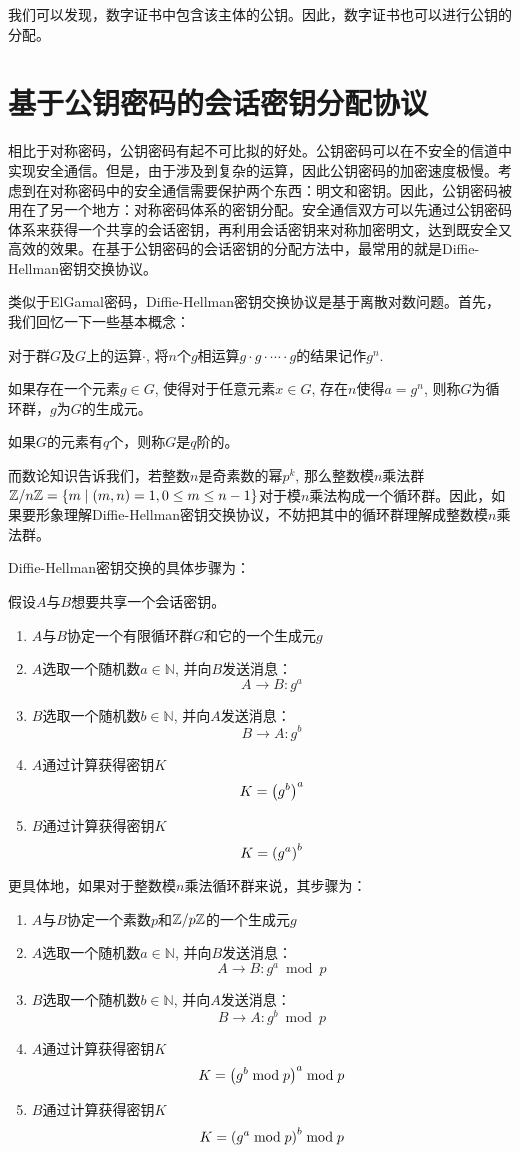 我们可以发现，数字证书中包含该主体的公钥。因此，数字证书也可以进行公钥的分配。
\section{基于公钥密码的会话密钥分配协议}
相比于对称密码，公钥密码有起不可比拟的好处。公钥密码可以在不安全的信道中实现安全通信。但是，由于涉及到复杂的运算，因此公钥密码的加密速度极慢。考虑到在对称密码中的安全通信需要保护两个东西：明文和密钥。因此，公钥密码被用在了另一个地方：对称密码体系的密钥分配。安全通信双方可以先通过公钥密码体系来获得一个共享的会话密钥，再利用会话密钥来对称加密明文，达到既安全又高效的效果。在基于公钥密码的会话密钥的分配方法中，最常用的就是Diffie-Hellman密钥交换协议。\par
类似于ElGamal密码，Diffie-Hellman密钥交换协议是基于离散对数问题。首先，我们回忆一下一些基本概念：\par
对于群$G$及$G$上的运算$\cdot$, 将$n$个$g$相运算$g\cdot g\cdot \cdots \cdot g$的结果记作$g^n$.\par
如果存在一个元素$g\in G$, 使得对于任意元素$x\in G$, 存在$n$使得$a=g^n$, 则称$G$为循环群，$g$为$G$的生成元。\par
如果$G$的元素有$q$个，则称$G$是$q$阶的。\par
而数论知识告诉我们，若整数$n$是奇素数的幂$p^k$, 那么整数模$n$乘法群$\mathbb{Z}/n\mathbb{Z}=\{m\mid \left( {m, n}\right)=1, 0\leq m\leq n-1\}$对于模$n$乘法构成一个循环群。因此，如果要形象理解Diffie-Hellman密钥交换协议，不妨把其中的循环群理解成整数模$n$乘法群。\par
Diffie-Hellman密钥交换的具体步骤为：\par
假设$A$与$B$想要共享一个会话密钥。
\begin{enumerate}
	\item $A$与$B$协定一个有限循环群$G$和它的一个生成元$g$
	\item $A$选取一个随机数$a\in\mathbb{N}$, 并向$B$发送消息：
	\[A\to B: g^a\]
	\item $B$选取一个随机数$b\in\mathbb{N}$, 并向$A$发送消息：
	\[B\to A: g^b\]
	\item $A$通过计算获得密钥$K$
	\[K=\left( {g^b}\right)^a\]
	\item $B$通过计算获得密钥$K$
	\[K=\left( {g^a}\right)^b\]
\end{enumerate}

更具体地，如果对于整数模$n$乘法循环群来说，其步骤为：
\begin{enumerate}
	\item $A$与$B$协定一个素数$p$和$\mathbb{Z}/p\mathbb{Z}$的一个生成元$g$
	\item $A$选取一个随机数$a\in\mathbb{N}$, 并向$B$发送消息：
	\[A\to B: g^a\bmod{p}\]
	\item $B$选取一个随机数$b\in\mathbb{N}$, 并向$A$发送消息：
	\[B\to A: g^b\bmod{p}\]
	\item $A$通过计算获得密钥$K$
	\[K=\left( {g^b\bmod{p}}\right)^a\bmod{p}\]
	\item $B$通过计算获得密钥$K$
	\[K=\left( {g^a\bmod{p}}\right)^b\bmod{p}\]
\end{enumerate}
